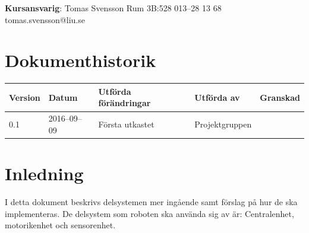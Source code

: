 \documentclass[a4paper,titlepage,12pt]{article}
\begin{document}
\begin{center}
		\centering
		\textbf{Kursansvarig}: Tomas Svensson Rum 3B:528 013--28 13 68 tomas.svensson@liu.se

		\newpage
		\tableofcontents
		\newpage



		\section*{Dokumenthistorik}
		\begin{table}[h]
			\begin{tabular}[pos]{ l l l l l }
				\textbf{Version} & \textbf{Datum} & \textbf{Utförda förändringar} 
				& \textbf{Utförda av} & \textbf{Granskad} \\ \midrule

				0.1 & 2016--09--09 & Första utkastet & Projektgruppen & \\

			\end{tabular}
		\end{table}
	\end{center}


	\newpage

	\section{Inledning}
	I detta dokument beskrivs delsystemen mer ingående samt förslag på hur de ska implementeras.
	De delsystem som roboten ska använda sig av är:
	Centralenhet, motorikenhet och sensorenhet.


  \newpage
\end{document}
